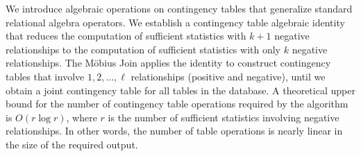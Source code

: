 \documentclass{sig-alternate-2013}
\begin{document}
%

We introduce algebraic operations on contingency tables that generalize standard relational algebra operators. 
We establish a contingency table algebraic identity that reduces the computation of sufficient statistics with $k+1$ negative relationships to the computation of sufficient statistics with only $k$ negative relationships. 
The M\"obius Join applies the identity to construct contingency tables that involve $1,2,\ldots,\ell$ relationships (positive and negative), until we obtain a joint contingency table for all tables in the database. A theoretical upper bound for the number of contingency table operations required by the algorithm is $O(r \log r)$,  where $r$ is the number of sufficient statistics involving negative relationships. In other words, the number of table operations is nearly linear in the size of the required output. 
\end{document}
